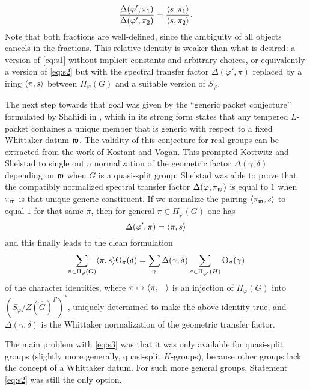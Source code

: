 \documentclass{article}
\theoremstyle{definition}
\numberwithin{equation}{section}
\renewcommand{\-}{\hyp{}}
\begin{document}
\[ \frac{\Delta(\varphi',\pi_1)}{\Delta(\varphi',\pi_2)} = \frac{\langle s,\pi_1\rangle}{\langle s,\pi_2\rangle}.\]
Note that both fractions are well-defined, since the ambiguity of all objects cancels in the fractions. This relative identity is weaker than what is desired: a version of \eqref{eq:s1} without implicit constants and arbitrary choices, or equivalently a version of \eqref{eq:s2} but with the spectral transfer factor $\Delta(\varphi',\pi)$ replaced by a iring $\langle\pi,s\rangle$ between $\Pi_\varphi(G)$ and a suitable version of $S_\varphi$.

The next step towards that goal was given by the ``generic packet conjecture'' formulated by Shahidi in \cite{Sha90}, which in its strong form states that any tempered $L$\-packet containes a unique member that is generic with respect to a fixed Whittaker datum $\mathfrak{w}$. The validity of this conjecture for real groups can be extracted from the work of Kostant and Vogan. This prompted Kottwitz and Shelstad to single out \cite[\S5.3]{KS99} a normalization of the geometric factor $\Delta(\gamma,\delta)$ depending on $\mathfrak{w}$ when $G$ is a quasi-split group. Shelstad was able to prove \cite[Theorem 11.5]{SheTE3} that the compatibly normalized spectral transfer factor $\Delta(\varphi,\pi_{\mathfrak{w}})$ is equal to $1$ when $\pi_{\mathfrak{w}}$ is that unique generic constituent. If we normalize the pairing $\langle\pi_{\mathfrak{w}},s\rangle$ to equal $1$ for that same $\pi$, then for general $\pi \in \Pi_\varphi(G)$ one has
\[ \Delta(\varphi',\pi) = \langle\pi,s\rangle \]
and this finally leads to the clean formulation
\begin{equation} \label{eq:s3}
	\sum_{\pi \in \Pi_\varphi(G)}\langle\pi,s\rangle\Theta_\pi(\delta) = \sum_\gamma \Delta(\gamma,\delta)\sum_{\sigma \in \Pi_{\varphi'}(H)} \Theta_{\sigma}(\gamma)
\end{equation}
of the character identities, where $\pi \mapsto \langle\pi,-\rangle$ is an injection of $\Pi_\varphi(G)$ into $(S_\varphi/Z(\hat G)^\Gamma)^*$, uniquely determined to make the above identity true, and $\Delta(\gamma,\delta)$ is the Whittaker normalization of the geometric transfer factor.

The main problem with \eqref{eq:s3} was that it was only available for quasi-split groups (slightly more generally, quasi-split $K$-groups), because other groups lack the concept of a Whittaker datum. For such more general groups, Statement \eqref{eq:s2} was still the only option. 
\end{document}
